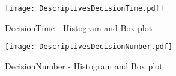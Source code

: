 \begin{figure}[htbp] %
\begin{center} 
\texttt{[image: DescriptivesDecisionTime.pdf]}
  \caption{DecisionTime - Histogram and Box plot}
    \label{DistributionDecisionTime} 
\end{center}
\end{figure}

\begin{figure}[htbp] %
\begin{center} 
\texttt{[image: DescriptivesDecisionNumber.pdf]}
  \caption{DecisionNumber - Histogram and Box plot}
    \label{DistributionDecisionNumber} 
\end{center}
\end{figure}

